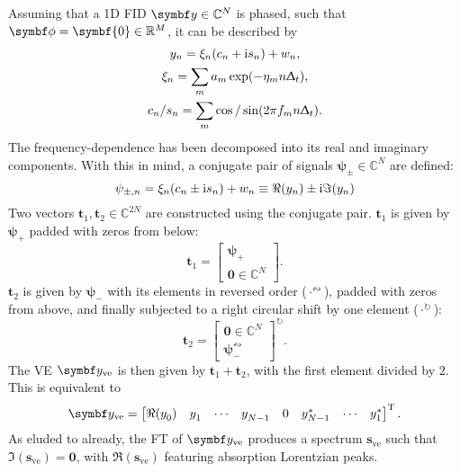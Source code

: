 Assuming that a \ac{1D} \ac{FID} $\by \in \mathbb{C}^N$ is phased, such that
$\bdphi = \symbf{0} \in \mathbb{R}^M$, it can be described by
\begin{subequations}
    \begin{gather}
        y_n = \xi_n (c_n + \mathrm{i} s_n) + w_n,\\
        \xi_n = \sum_m a_m \exp(-\eta_m n \Updelta_t),\\
        c_n / s_n = \sum_m \cos / \sin(2 \pi f_m n \Updelta_t).
    \end{gather}
\end{subequations}
The frequency-dependence has been decomposed into its real and imaginary
components. With this in mind, a conjugate pair of signals $\symbf{\psi}_{\pm}
\in \mathbb{C}^N$ are defined:
\begin{equation}
    \psi_{\pm,n} = \xi_n (c_n \pm \mathrm{i} s_n) + w_n \equiv \Re(y_n) \pm \mathrm{i} \Im(y_n)
\end{equation}
Two vectors $\symbf{t}_{1}, \symbf{t}_2 \in \mathbb{C}^{2N}$
are constructed using the conjugate pair.
$\symbf{t}_1$ is given by $\symbf{\psi}_+$ padded with zeros from below:
    \begin{equation}
        \symbf{t}_1 = \begin{bmatrix}
            \symbf{\psi}_+ \\ \symbf{0} \in \mathbb{C}^{N}
        \end{bmatrix}.
    \end{equation}
$\symbf{t}_2$ is given by $\symbf{\psi}_{-}$ with its elements in
    reversed order ($\cdot^{{\leftrightsquigarrow}}$), padded with zeros
    from above, and finally subjected to a right circular shift by one
    element ($\cdot^{{\circlearrowright}}$):
    \begin{equation}
        \symbf{t}_2 = \begin{bmatrix}
            \symbf{0} \in \mathbb{C}^{N} \\ \symbf{\psi}_-^{{\leftrightsquigarrow}}
    \end{bmatrix}^{{\circlearrowright}}.
   \end{equation}
The \ac{VE} $\by_{\text{ve}}$ is then given by $\symbf{t}_1 +
\symbf{t}_2$, with the first element divided by $2$. This is equivalent to
\begin{equation}
    \by_{\text{ve}} =
    \begin{bmatrix}
        \Re(y_0^{\vphantom{*}}) &
        y_1^{\vphantom{*}} &
        \cdots &
        y_{N-1}^{\vphantom{*}} &
        0 &
        y_{N-1}^* &
        \cdots &
        y_1^*
    \end{bmatrix}\T.
\end{equation}
As eluded to already, the \ac{FT} of $\by_{\text{ve}}$ produces a spectrum
$\symbf{s}_{\text{ve}}$ such that $\Im\left(\symbf{s}_{\text{ve}}\right) =
\symbf{0}$, with $\Re\left(\symbf{s}_{\text{ve}}\right)$ featuring absorption
Lorentzian peaks.

